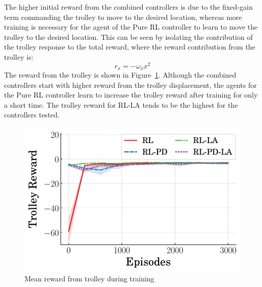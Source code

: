 The higher initial reward from the combined controllers is due to the fixed-gain term commanding the trolley to move to the desired location, whereas more training is necessary for the agent of the Pure RL controller to learn to move the trolley to the desired location.
%
This can be seen by isolating the contribution of the trolley response to the total reward, where the reward contribution from the trolley is:
%
\begin{equation}
    r_{x} = -\omega_x x^2
\end{equation}
%
The reward from the trolley is shown in Figure~\ref{fig:mean_settling_baseline}.
%
Although the combined controllers start with higher reward from the trolley displacement, the agents for the Pure RL controller learn to increase the trolley reward after training for only a short time. The trolley reward for RL-LA tends to be the highest for the controllers tested.
%
\begin{figure}[tb]
    \centering
    \includegraphics[width=0.65\columnwidth]{figures/figures_RL_model_based_control/Trolley_reward_v_episode.pdf}
    \vspace{-2ex}
    \caption{Mean reward from trolley during training}
    \label{fig:mean_settling_baseline}
\end{figure}

